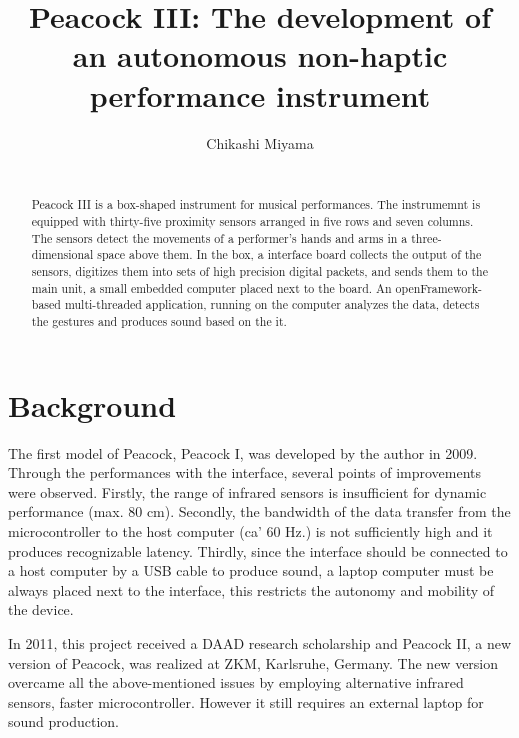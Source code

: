 \documentclass{nime-alternate}
\begin{document}

\title{Peacock III: The development of an autonomous non-haptic performance instrument}
\author{
\alignauthor
Chikashi Miyama\\
       \\
}

\maketitle
\begin{abstract}
Peacock III is a box-shaped instrument for musical performances. The instrumemnt is equipped with thirty-five proximity sensors arranged in five rows and seven columns. The sensors detect the movements of a performer's hands and arms in a three-dimensional space above them. In the box, a interface board collects the output of the sensors,  digitizes them into sets of high precision digital packets, and sends them to the main unit, a small embedded computer placed next to the board. An openFramework-based multi-threaded application, running on the computer analyzes the data, detects the gestures and produces sound based on the it.  
\end{abstract}


\section{Background}

The first model of Peacock, Peacock I,  was developed by the author in 2009\cite{miyama:peacock}. Through the performances with the interface, several points of improvements were observed. Firstly, the range of infrared sensors is insufficient for dynamic performance (max. 80 cm). Secondly, the bandwidth of the data transfer from the microcontroller to the host computer (ca' 60 Hz.) is not sufficiently high and it produces recognizable latency. Thirdly, since the interface should be connected to a host computer by a USB cable to produce sound, a laptop computer must be always placed next to the interface, this restricts the autonomy and mobility of the device.

In 2011, this project received a DAAD research scholarship and Peacock II, a new version of Peacock, was realized at ZKM, Karlsruhe, Germany. The new version overcame all the above-mentioned issues by employing alternative infrared sensors, faster microcontroller. However it still requires an external laptop for sound production.
\end{document}
